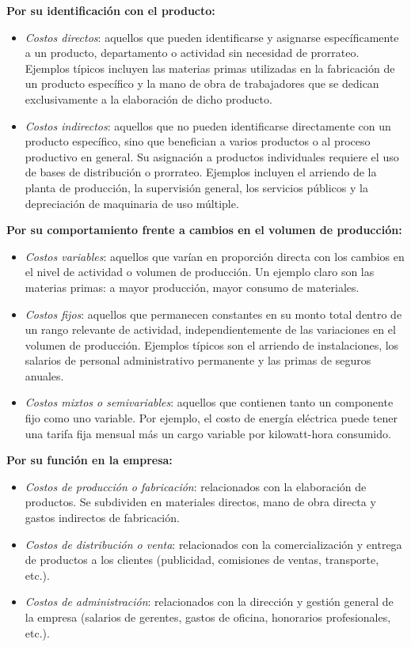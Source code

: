 \documentclass[
  stu,
  floatsintext,
  longtable,
  a4paper,
  nolmodern,
  notxfonts,
  notimes,
  12pt,
  colorlinks=true,linkcolor=blue,citecolor=blue,urlcolor=blue]{apa7}
\begin{document}
\textbf{Por su identificación con el producto:}

\begin{itemize}
\item
  \emph{Costos directos}: aquellos que pueden identificarse y asignarse
  específicamente a un producto, departamento o actividad sin necesidad
  de prorrateo. Ejemplos típicos incluyen las materias primas utilizadas
  en la fabricación de un producto específico y la mano de obra de
  trabajadores que se dedican exclusivamente a la elaboración de dicho
  producto.
\item
  \emph{Costos indirectos}: aquellos que no pueden identificarse
  directamente con un producto específico, sino que benefician a varios
  productos o al proceso productivo en general. Su asignación a
  productos individuales requiere el uso de bases de distribución o
  prorrateo. Ejemplos incluyen el arriendo de la planta de producción,
  la supervisión general, los servicios públicos y la depreciación de
  maquinaria de uso múltiple.
\end{itemize}

\textbf{Por su comportamiento frente a cambios en el volumen de
producción:}

\begin{itemize}
\item
  \emph{Costos variables}: aquellos que varían en proporción directa con
  los cambios en el nivel de actividad o volumen de producción. Un
  ejemplo claro son las materias primas: a mayor producción, mayor
  consumo de materiales.
\item
  \emph{Costos fijos}: aquellos que permanecen constantes en su monto
  total dentro de un rango relevante de actividad, independientemente de
  las variaciones en el volumen de producción. Ejemplos típicos son el
  arriendo de instalaciones, los salarios de personal administrativo
  permanente y las primas de seguros anuales.
\item
  \emph{Costos mixtos o semivariables}: aquellos que contienen tanto un
  componente fijo como uno variable. Por ejemplo, el costo de energía
  eléctrica puede tener una tarifa fija mensual más un cargo variable
  por kilowatt-hora consumido.
\end{itemize}

\textbf{Por su función en la empresa:}

\begin{itemize}
\item
  \emph{Costos de producción o fabricación}: relacionados con la
  elaboración de productos. Se subdividen en materiales directos, mano
  de obra directa y gastos indirectos de fabricación.
\item
  \emph{Costos de distribución o venta}: relacionados con la
  comercialización y entrega de productos a los clientes (publicidad,
  comisiones de ventas, transporte, etc.).
\item
  \emph{Costos de administración}: relacionados con la dirección y
  gestión general de la empresa (salarios de gerentes, gastos de
  oficina, honorarios profesionales, etc.).
\end{itemize}
\end{document}
